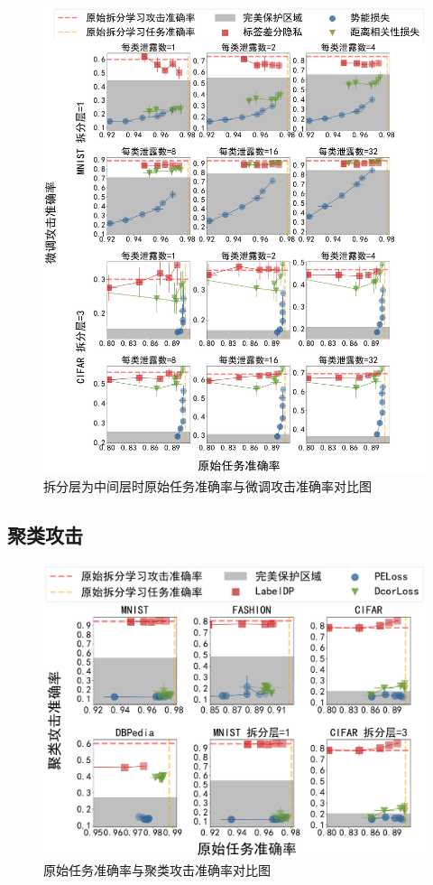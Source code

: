 \begin{figure}[h!]
    \centering
    \includegraphics[width=0.85\linewidth]{Z_Resources/peloss_fine-tuning-middle}
    \caption{拆分层为中间层时原始任务准确率与微调攻击准确率对比图}
    \label{fig:peloss:fine-tuning-middle}
\end{figure}


\subsection{聚类攻击}
\begin{figure}[h!]
    \centering
    \includegraphics[width=0.8\linewidth]{Z_Resources/peloss_cluster-attack-both}
    \caption{原始任务准确率与聚类攻击准确率对比图}
    \label{fig:peloss:clustering}
\end{figure}

